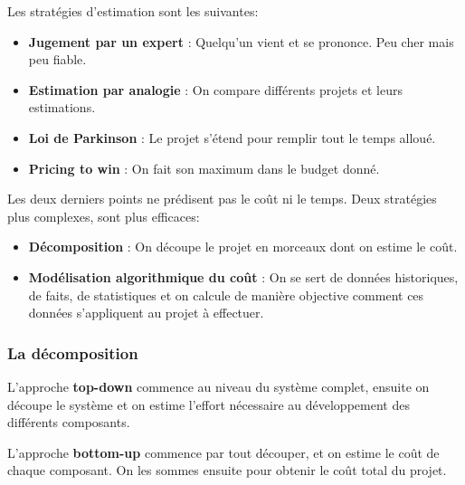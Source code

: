 Les stratégies d’estimation sont les suivantes:
\begin{itemize}
    \item \textbf{Jugement par un expert} : Quelqu’un vient et se prononce. Peu cher mais peu fiable.
    \item \textbf{Estimation par analogie} : On compare différents projets et leurs estimations.
    \item \textbf{Loi de Parkinson} : Le projet s’étend pour remplir tout le temps alloué.
    \item \textbf{Pricing to win} : On fait son maximum dans le budget donné.
\end{itemize}
Les deux derniers points ne prédisent pas le coût ni le temps. Deux stratégies plus complexes, sont plus efficaces:
\begin{itemize}
    \item \textbf{Décomposition} : On découpe le projet en morceaux dont on estime le coût.
    \item \textbf{Modélisation algorithmique du coût} : On se sert de données historiques, de faits, de statistiques et on calcule de manière objective comment ces données s’appliquent au projet à effectuer.
\end{itemize}



\subsubsection{La décomposition}
L’approche \textbf{top-down} commence au niveau du système complet, ensuite on découpe le système et on estime l’effort nécessaire au développement des différents composants.

L’approche \textbf{bottom-up} commence par tout découper, et on estime le coût de chaque composant. On les sommes ensuite pour obtenir le coût total du projet.



